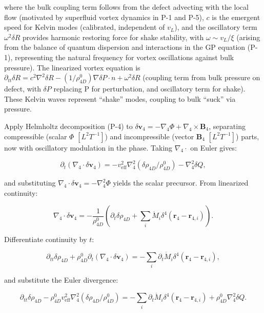 where the bulk coupling term follows from the defect advecting with the local flow (motivated by superfluid vortex dynamics in P-1 and P-5), $c$ is the emergent speed for Kelvin modes (calibrated, independent of $v_L$), and the oscillatory term $\omega^2 \delta R$ provides harmonic restoring force for shake stability, with $\omega \sim v_L / \xi$ (arising from the balance of quantum dispersion and interactions in the GP equation (P-1), representing the natural frequency for vortex oscillations against bulk pressure). The linearized vortex equation is $\partial_{tt} \delta R = c^2 \nabla^2 \delta R - (1 / \rho_{4D}^0) \nabla \delta P \cdot n + \omega^2 \delta R$ (coupling term from bulk pressure on defect, with $\delta P$ replacing P for perturbation, and oscillatory term for shake). These Kelvin waves represent ``shake'' modes, coupling to bulk ``suck'' via pressure.

Apply Helmholtz decomposition (P-4) to $\delta \mathbf{v}_4 = -\nabla_4 \Phi + \nabla_4 \times \mathbf{B}_4$, separating compressible (scalar $\Phi$ $[L^2 T^{-1}]$) and incompressible (vector $\mathbf{B}_4$ $[L^2 T^{-1}]$) parts, now with oscillatory modulation in the phase. Taking $\nabla_4 \cdot$ on Euler gives:

\begin{equation}
\partial_t (\nabla_4 \cdot \delta \mathbf{v}_4) = -v_{\text{eff}}^2 \nabla_4^2 (\delta \rho_{4D} / \rho_{4D}^0) - \nabla_4^2 \delta Q,
\end{equation}

and substituting $\nabla_4 \cdot \delta \mathbf{v}_4 = -\nabla_4^2 \Phi$ yields the scalar precursor. From linearized continuity:

\begin{equation}
\nabla_4 \cdot \delta \mathbf{v}_4 = -\frac{1}{\rho_{4D}^0} \left( \partial_t \delta \rho_{4D} + \sum_i \dot{M}_i \delta^4(\mathbf{r}_4 - \mathbf{r}_{4,i}) \right).
\end{equation}

Differentiate continuity by $t$:

\begin{equation}
\partial_{tt} \delta \rho_{4D} + \rho_{4D}^0 \partial_t (\nabla_4 \cdot \delta \mathbf{v}_4) = -\sum_i \partial_t \dot{M}_i \delta^4(\mathbf{r}_4 - \mathbf{r}_{4,i}),
\end{equation}

and substitute the Euler divergence:

\begin{equation}
\partial_{tt} \delta \rho_{4D} - \rho_{4D}^0 v_{\text{eff}}^2 \nabla_4^2 (\delta \rho_{4D} / \rho_{4D}^0) = -\sum_i \partial_t \dot{M}_i \delta^4(\mathbf{r}_4 - \mathbf{r}_{4,i}) + \rho_{4D}^0 \nabla_4^2 \delta Q.
\end{equation}

